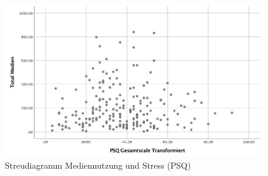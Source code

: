 \begin{figure}%
  \centering
     \includegraphics[scale=0.4]{content/Grafik/Streudiagramm_TotalMedien_PSQ.jpg}
  \caption{Streudiagramm Mediennutzung und Stress (PSQ)}
  \label{fig:AppStreudiagrammMedienPsq}
\end{figure}